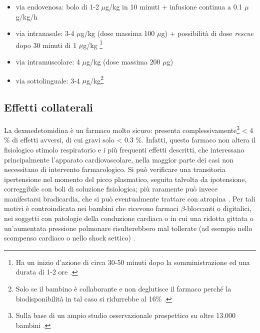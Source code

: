 \begin{itemize}
    \item via endovenosa: bolo di 1-2 $\mu$g/kg in 10 minuti + infusione continua a 0.1 $\mu$g/kg/h
    \item via intranasale: 3-4 $\mu$g/kg (dose massima 100 $\mu$g) + possibilità di dose \emph{rescue} dopo 30 minuti di 1 $\mu$g/kg \footnote{Ha un inizio d'azione di circa 30-50 minuti dopo la somministrazione ed una durata di 1-2 ore \cite{Simeupsedazione}.}
    \item via intramuscolare: 4 $\mu$g/kg (dose massima 200 $\mu$g)
    \item via sottolinguale: 3-4 $\mu$g/kg\footnote{Solo se il bambino è collaborante e non deglutisce il farmaco perché la biodisponibilità in tal caso si ridurrebbe al 16$\%$ \cite{Weerink2017}.}
\end{itemize}

\subsection*{Effetti collaterali}

La dexmedetomidina è un farmaco molto sicuro: presenta complessivamente\footnote{Sulla base di un ampio studio osservazionale prospettico su oltre 13.000 bambini \cite{Sulton2016}.} < 4 $\%$ di effetti avversi, di cui gravi solo < 0.3 $\%$. Infatti, questo farmaco non altera il fisiologico stimolo respiratorio e i più frequenti effetti descritti, che interessano principalmente l'apparato cardiovascolare, nella maggior parte dei casi non necessitano di intervento farmacologico. Si può verificare una transitoria ipertensione nel momento del picco plasmatico, seguita talvolta da ipotensione, correggibile con boli di soluzione fisiologica; più raramente può invece manifestarsi bradicardia, che si può eventualmente trattare con atropina \cite{Sulton2016}. Per tali motivi è controindicata nei bambini che ricevono farmaci $\beta$-bloccanti o digitalici, nei soggetti con patologie della conduzione cardiaca o in cui una ridotta gittata o un'aumentata pressione polmonare risulterebbero mal tollerate (ad esempio nello scompenso cardiaco o nello shock settico) \cite{Uptodatepharmacology, Simeupsedazione}. 